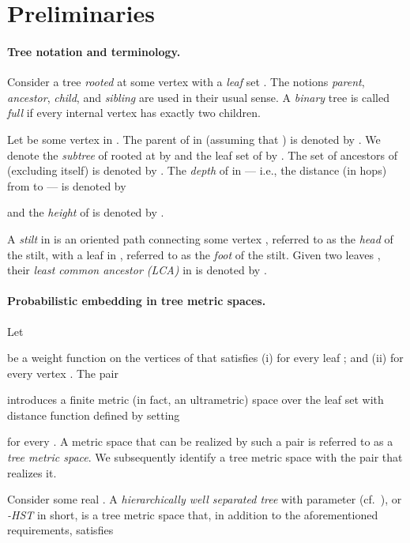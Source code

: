 \documentclass[11pt]{article}
\theoremstyle{definition}
\theoremstyle{plain}
\theoremstyle{definition}
\theoremstyle{plain}
\theoremstyle{definition}
\theoremstyle{plain}
\newcommand{\NotationLabel}[1]{\label{notationTable:#1}\ignorespaces}
\begin{document}
\section{Preliminaries}
\label{section:preliminaries}


\paragraph{Tree notation and terminology.}
Consider a tree  \emph{rooted} at some vertex  with a \emph{leaf} set
.
The notions \emph{parent}, \emph{ancestor}, \emph{child}, and \emph{sibling}
are used in their usual sense.
A \emph{binary} tree is called \emph{full} if every internal vertex has
exactly two children.

Let  be some vertex in .
The parent of  in  (assuming that ) is denoted by
.
\NotationLabel{tree:parent}
We denote the \emph{subtree} of  rooted at  by 
\NotationLabel{tree:subtree}
and the leaf set of  by .
\NotationLabel{tree:subtree-leaves}
The set of ancestors of  (excluding  itself) is denoted by
.
\NotationLabel{tree:ancestors}
The \emph{depth} of  in  --- i.e., the distance (in hops) from  to
 --- is denoted by

\NotationLabel{tree:depth}
and the \emph{height} of  is denoted by
.
\NotationLabel{tree:height}

A \emph{stilt} in  is an oriented path connecting some vertex ,
referred to as the \emph{head} of the stilt, with a leaf in ,
referred to as the \emph{foot} of the stilt.
Given two leaves , their \emph{least common ancestor (LCA)}
in  is denoted by
.
\NotationLabel{tree-lca}

\paragraph{Probabilistic embedding in tree metric spaces.}
Let

be a weight function on the vertices of  that satisfies
(i)  for every leaf ; and
(ii) 
for every vertex
.
The pair

introduces a finite metric (in fact, an ultrametric) space over the leaf set
 with distance function  defined by setting

for every .
A metric space that can be realized by such a  pair is referred to as
a \emph{tree metric space}.
We subsequently identify a tree metric space with the pair  that
realizes it.

Consider some real .
A \emph{hierarchically well separated tree} with parameter 
(cf.\ \cite{Bartal1996}), or \emph{-HST} in short, is a tree metric
space  that, in addition to the aforementioned
requirements, satisfies
\end{document}
